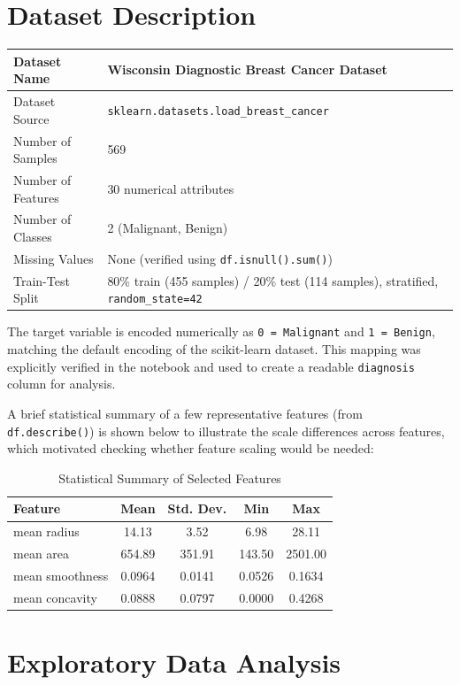 \documentclass[12pt,a4paper]{article}
\begin{document}
\section{Dataset Description}
\begin{longtable}{|p{6cm}|p{8cm}|}
\hline
Dataset Name & Wisconsin Diagnostic Breast Cancer Dataset \\ \hline
Dataset Source & \texttt{sklearn.datasets.load\_breast\_cancer} \\ \hline
Number of Samples & 569 \\ \hline
Number of Features & 30 numerical attributes \\ \hline
Number of Classes & 2 (Malignant, Benign) \\ \hline
Missing Values & None (verified using \texttt{df.isnull().sum()}) \\ \hline
Train-Test Split & 80\% train (455 samples) / 20\% test (114 samples), stratified, \texttt{random\_state=42} \\ \hline
\end{longtable}

The target variable is encoded numerically as \texttt{0 = Malignant} and \texttt{1 = Benign}, matching the default encoding of the scikit-learn dataset. This mapping was explicitly verified in the notebook and used to create a readable \texttt{diagnosis} column for analysis.

\vspace{0.2cm}
A brief statistical summary of a few representative features (from \texttt{df.describe()}) is shown below to illustrate the scale differences across features, which motivated checking whether feature scaling would be needed:

\begin{table}[H]
\centering
\caption{Statistical Summary of Selected Features}
\begin{tabular}{lcccc}
\toprule
Feature & Mean & Std. Dev. & Min & Max \\
\midrule
mean radius      & 14.13  & 3.52  & 6.98  & 28.11 \\
mean area        & 654.89 & 351.91 & 143.50 & 2501.00 \\
mean smoothness  & 0.0964 & 0.0141 & 0.0526 & 0.1634 \\
mean concavity   & 0.0888 & 0.0797 & 0.0000 & 0.4268 \\
\bottomrule
\end{tabular}
\end{table}

\section{Exploratory Data Analysis}
\end{document}
